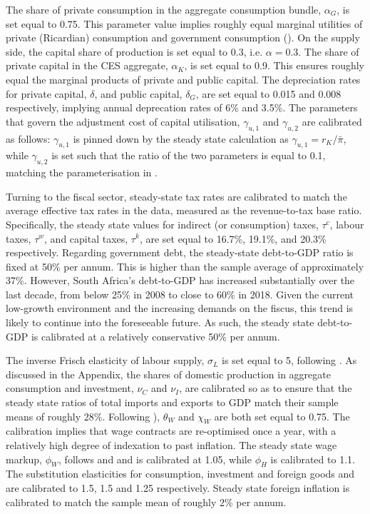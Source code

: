 \documentclass[a4paper,11pt]{article}
\numberwithin{equation}{section}
\begin{document}
	The share of private consumption in the aggregate consumption bundle, $\alpha_G$, is set equal to 0.75. This parameter value implies roughly equal marginal utilities of private (Ricardian) consumption and government consumption (\citealp{coenen2013}). On the supply side, the capital share of production is set equal to 0.3, i.e. $\alpha=0.3$. The share of private capital in the CES aggregate, $\alpha_K$, is set equal to 0.9. This ensures roughly equal the marginal products of private and public capital. The depreciation rates for private capital, $\delta$, and public capital, $\delta_G$, are set equal to 0.015 and 0.008 respectively, implying annual deprecation rates of 6\% and 3.5\%. The parameters that govern the adjustment cost of capital utilisation, $\gamma_{u,1}$ and $\gamma_{u,2}$ are calibrated as follows: $\gamma_{u,1}$ is pinned down by the steady state calculation as $\gamma_{u,1}=r_K/\bar{\pi}$, while $\gamma_{u,2}$ is set such that the ratio of the two parameters is equal to 0.1, matching the parameterisation in \cite{steinbach2014}. 
	
	Turning to the fiscal sector, steady-state tax rates are calibrated to match the average effective tax rates in the data, measured as the revenue-to-tax base ratio. Specifically, the steady state values for indirect (or consumption) taxes, $\tau^c$, labour taxes, $\tau^w$, and capital taxes, $\tau^k$, are set equal to 16.7\%, 19.1\%, and 20.3\% respectively. Regarding government debt, the steady-state debt-to-GDP ratio is fixed at 50\% per annum. This is higher than the sample average of approximately 37\%. However, South Africa's debt-to-GDP has increased substantially  over the last decade, from below 25\% in 2008 to close to 60\% in 2018. Given the current low-growth environment and the increasing demands on the fiscus, this trend is likely to continue into the foreseeable future. As such, the steady state debt-to-GDP is calibrated at a relatively conservative 50\% per annum.
	
	The inverse Frisch elasticity of labour supply, $\sigma_L$ is set equal to 5, following \cite{steinbach2014}. As discussed in the Appendix, the shares of domestic production in aggregate consumption and investment, $\nu_C$ and $\nu_I$, are calibrated so as to ensure that the steady state ratios of total imports and exports to GDP match their sample means of roughly 28\%. Following \citealp{steinbach2014}), $\theta_W$ and $\chi_W$ are both set equal to 0.75. The calibration implies that wage contracts are re-optimised once a year, with a relatively high degree of indexation to past inflation. The steady state wage markup, $\phi_W$, follows \cite{adolfson2007} and \cite{steinbach2014} and is calibrated at 1.05, while $\phi_H$ is calibrated to 1.1. The substitution elasticities for consumption, investment and foreign goods and are calibrated to 1.5, 1.5 and 1.25 respectively. Steady state foreign inflation is calibrated to match the sample mean of roughly 2\% per annum.
	
\end{document}
